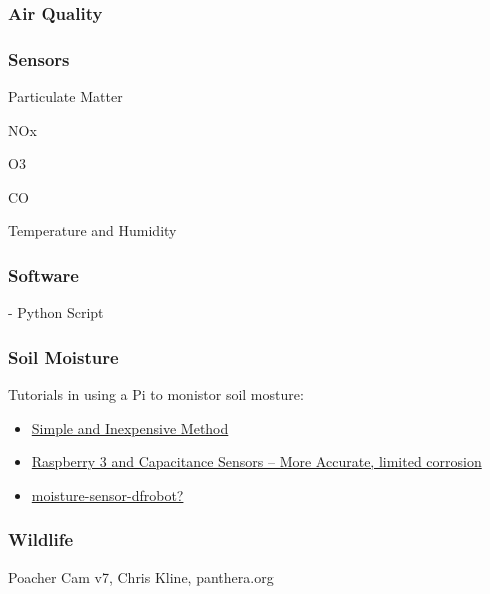 \documentclass{article}\usepackage[]{graphicx}\usepackage[]{color}
\begin{document}

\subsubsection{Air Quality}

\subsubsection{Sensors}

Particulate Matter

NOx

O3

CO

Temperature and Humidity

\subsubsection{Software}

- Python Script

\subsubsection{Soil Moisture}


Tutorials in using a Pi to monistor soil mosture:

\begin{itemize}

\item \href{https://tutorials-raspberrypi.com/measuring-soil-moisture-with-raspberry-pi/}{Simple and Inexpensive Method}

\item \href{moisture-sensor-dfrobothttps://www.switchdoc.com/2018/11/tutorial-capacitive-moisture-sensor-grove/}{Raspberry 3 and Capacitance Sensors -- More Accurate, limited corrosion}

\item \href{https://tutorials-raspberrypi.com/raspberry-pi-capacitive-spoil-moisture-sensor-dfrobot-gravity/}{moisture-sensor-dfrobot?}
\end{itemize}

\subsubsection{Wildlife}

Poacher Cam v7, Chris Kline, panthera.org
\end{document}
